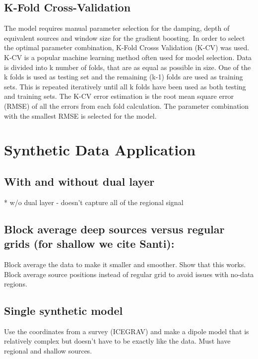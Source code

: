 \subsection{K-Fold Cross-Validation}
The model requires manual parameter selection for the damping, depth of equivalent sources and window size for the gradient boosting. In order to select the optimal parameter combination, K-Fold Crosss Validation (K-CV) was used. K-CV is a popular machine learning method often used for model selection. Data is divided into k number of folds, that are as equal as possible in size. One of the k folds is used as testing set and the remaining (k-1) folds are used as training sets. This is repeated iteratively until all k folds have been used as both testing and training sets. The K-CV error estimation is the root mean square error (RMSE) of all the errors from each fold calculation. The parameter combination with the smallest RMSE is selected for the model.




\section{Synthetic Data Application}

\subsection{With and without dual layer}
* w/o dual layer - doesn't capture all of the regional signal

\subsection{Block average deep sources versus regular grids (for shallow we cite Santi):}
Block average the data to make it smaller and smoother. Show that this works.
Block average source positions instead of regular grid to avoid issues with no-data regions.

\subsection{Single synthetic model}
Use the coordinates from a survey (ICEGRAV) and make a dipole model that is relatively complex but doesn't have to be exactly like the data. Must have regional and shallow sources.


